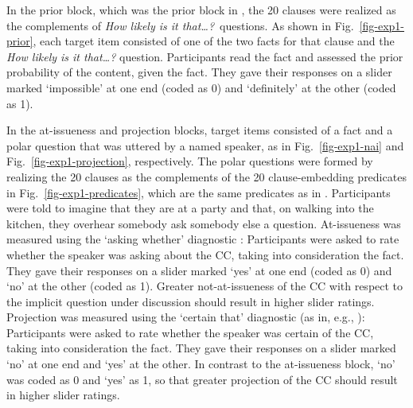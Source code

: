 \documentclass[11pt,fleqn]{article}
\newcommand{\6}{\mbox{$[\hspace*{-.6mm}[$}}
\newcommand{\9}{\mbox{$]\hspace*{-.6mm}]$}}
\begin{document}
In the prior block, which was the prior block in \citealt{degen-tonhauser-openmind}, the 20 clauses were realized as the complements of {\em How likely is it that\ldots?}~questions. As shown in Fig.~\ref{fig-exp1-prior}, each target item consisted of one of the two facts for that clause and the {\em How likely is it that\ldots?} question. Participants read the fact and assessed the prior probability of the content, given the fact. They gave their responses on a slider marked `impossible' at one end (coded as 0) and `definitely' at the other (coded as 1). 

In the at-issueness and projection blocks, target items consisted of a fact and a polar question that was uttered by a named speaker, as in Fig.~\ref{fig-exp1-nai} and Fig.~\ref{fig-exp1-projection}, respectively. The polar questions were formed by realizing the 20 clauses as the complements of the 20 clause-embedding predicates in Fig.~\ref{fig-exp1-predicates}, which are the same predicates as in \citealt{degen-tonhauser-openmind,degen-tonhauser-language}.  Participants were told to imagine that they are at a party and that, on walking into the kitchen, they overhear somebody ask somebody else a question. At-issueness was measured using the `asking whether' diagnostic  \citep[as in][]{tbd-variability}: Participants were asked to rate whether the speaker was asking about the CC, taking into consideration the fact. They gave their responses on a slider marked `yes' at one end (coded as 0) and `no' at the other (coded as 1). Greater not-at-issueness of the CC with respect to the implicit question under discussion should result in higher slider ratings. Projection was measured using the `certain that' diagnostic (as in, e.g., \citealt{tbd-variability, mahler2020,degen-tonhauser-language}): Participants were asked to rate whether the speaker was certain of the CC, taking into consideration the fact. They gave their responses on a slider marked `no' at one end and `yes' at the other.  In contrast to the at-issueness block, `no' was coded as 0 and `yes' as 1, so that greater projection of the CC should result in higher slider ratings. 
\end{document}
